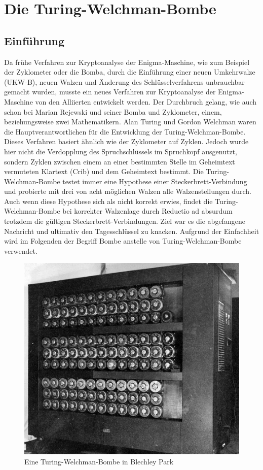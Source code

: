 \chapter{Die Turing-Welchman-Bombe}\label{ch:die-turing-bombe}

\section{Einführung}\label{sec:einfuerung_bombe}

Da frühe Verfahren zur Kryptoanalyse der Enigma-Maschine, wie zum Beispiel der \glqq Zyklometer\grqq{} oder die \glqq Bomba\grqq{}, durch die Einführung einer neuen Umkehrwalze (UKW-B), neuen Walzen und Änderung des Schlüsselverfahrens unbrauchbar gemacht wurden, musste ein neues Verfahren zur Kryptoanalyse der Enigma-Maschine von den Alliierten entwickelt werden. 
Der Durchbruch gelang, wie auch schon bei Marian Rejewski und seiner Bomba und Zyklometer, einem, beziehungsweise zwei Mathematikern.
Alan Turing und Gordon Welchman waren die Hauptverantwortlichen für die Entwicklung der \glqq Turing-Welchman-Bombe\grqq. 
Dieses Verfahren basiert ähnlich wie der Zyklometer auf \glqq Zyklen\grqq. 
Jedoch wurde hier nicht die Verdopplung des Spruchschlüssels im Spruchkopf ausgenutzt, sondern Zyklen zwischen einem an einer bestimmten Stelle im Geheimtext vermuteten Klartext (Crib) und dem Geheimtext bestimmt.
Die Turing-Welchman-Bombe testet immer eine Hypothese einer Steckerbrett-Verbindung und probierte mit drei von acht möglichen Walzen alle Walzenstellungen durch.
Auch wenn diese Hypothese sich als nicht korrekt erwies, findet die Turing-Welchman-Bombe bei korrekter Walzenlage durch Reductio ad absurdum trotzdem die gültigen Steckerbrett-Verbindungen.
Ziel war es die abgefangene Nachricht und ultimativ den Tagesschlüssel zu knacken.
Aufgrund der Einfachheit wird im Folgenden der Begriff \glqq Bombe\grqq{} anstelle von \glqq Turing-Welchman-Bombe\grqq{} verwendet.
\nopagebreak
\begin{figure}
	\centering
	\includegraphics[width=0.4\linewidth]{Turing Bomb/BletchleyParkBombe}
	\caption{Eine Turing-Welchman-Bombe in Blechley Park\autocite{wiki:bombe_picture}}
	\label{fig:bombe}
\end{figure}

